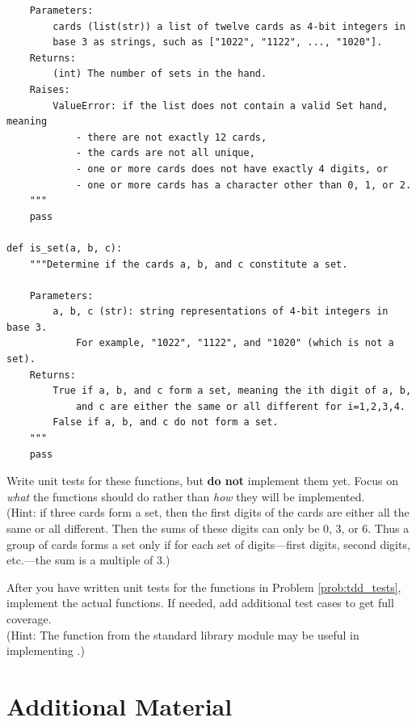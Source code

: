 \begin{problem}
\begin{lstlisting}
    Parameters:
        cards (list(str)) a list of twelve cards as 4-bit integers in
        base 3 as strings, such as ["1022", "1122", ..., "1020"].
    Returns:
        (int) The number of sets in the hand.
    Raises:
        ValueError: if the list does not contain a valid Set hand, meaning
            - there are not exactly 12 cards,
            - the cards are not all unique,
            - one or more cards does not have exactly 4 digits, or
            - one or more cards has a character other than 0, 1, or 2.
    """
    pass

def is_set(a, b, c):
    """Determine if the cards a, b, and c constitute a set.

    Parameters:
        a, b, c (str): string representations of 4-bit integers in base 3.
            For example, "1022", "1122", and "1020" (which is not a set).
    Returns:
        True if a, b, and c form a set, meaning the ith digit of a, b,
            and c are either the same or all different for i=1,2,3,4.
        False if a, b, and c do not form a set.
    """
    pass
\end{lstlisting}

Write unit tests for these functions, but \textbf{do not} implement them yet.
Focus on \emph{what} the functions should do rather than \emph{how} they will be implemented.
\\ (Hint: if three cards form a set, then the first digits of the cards are either all the same or all different.
Then the sums of these digits can only be 0, 3, or 6.
Thus a group of cards forms a set only if for each set of digits---first digits, second digits, etc.---the sum is a multiple of 3.)
\label{prob:tdd_tests}
\end{problem}

\begin{problem}
After you have written unit tests for the functions in Problem \ref{prob:tdd_tests}, implement the actual functions.
If needed, add additional test cases to get full coverage.
\\ (Hint: The  function from the standard library module  may be useful in implementing .)
\end{problem}

\newpage

\section*{Additional Material} %

